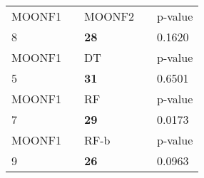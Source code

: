 \begin{tabular}{ l l l l l}
\midrule
{MOONF1} & & {MOONF2} & & {p-value}\\
8 & & \textbf{28} & & 0.1620\\
\midrule
{MOONF1} & & {DT} & & {p-value}\\
5 & & \textbf{31} & & 0.6501\\
\midrule
{MOONF1} & & {RF} & & {p-value}\\
7 & & \textbf{29} & & 0.0173\\
\midrule
{MOONF1} & & {RF-b} & & {p-value}\\
9 & & \textbf{26} & & 0.0963\\
\midrule
\end{tabular}
